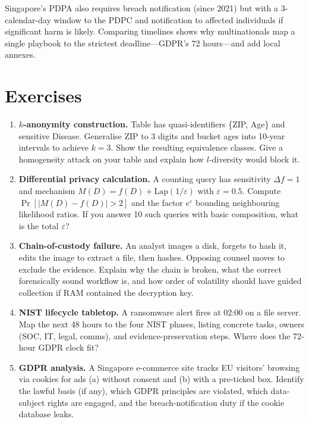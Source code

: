 \begin{remark}
Singapore's PDPA also requires breach notification (since 2021) but with a 3-calendar-day window to the PDPC and notification to affected individuals if significant harm is likely. Comparing timelines shows why multinationals map a single playbook to the strictest deadline---GDPR's 72 hours---and add local annexes.
\end{remark}
\section{Exercises}
\label{sec:ch08-exercises}
\begin{enumerate}[label=E8.\arabic*, leftmargin=*, itemsep=0.6em]
    \item \textbf{$k$-anonymity construction.} Table has quasi-identifiers \{ZIP, Age\} and sensitive Disease. Generalise ZIP to 3 digits and bucket ages into 10-year intervals to achieve $k=3$. Show the resulting equivalence classes. Give a homogeneity attack on your table and explain how $l$-diversity would block it.
    \item \textbf{Differential privacy calculation.} A counting query has sensitivity $\Delta f=1$ and mechanism $M(D)=f(D)+\mathrm{Lap}(1/\varepsilon)$ with $\varepsilon=0.5$. Compute $\Pr[|M(D)-f(D)|>2]$ and the factor $e^{\varepsilon}$ bounding neighbouring likelihood ratios. If you answer 10 such queries with basic composition, what is the total $\varepsilon$?
    \item \textbf{Chain-of-custody failure.} An analyst images a disk, forgets to hash it, edits the image to extract a file, then hashes. Opposing counsel moves to exclude the evidence. Explain why the chain is broken, what the correct forensically sound workflow is, and how order of volatility should have guided collection if RAM contained the decryption key.
    \item \textbf{NIST lifecycle tabletop.} A ransomware alert fires at 02:00 on a file server. Map the next 48 hours to the four NIST phases, listing concrete tasks, owners (SOC, IT, legal, comms), and evidence-preservation steps. Where does the 72-hour GDPR clock fit?
    \item \textbf{GDPR analysis.} A Singapore e-commerce site tracks EU visitors' browsing via cookies for ads (a) without consent and (b) with a pre-ticked box. Identify the lawful basis (if any), which GDPR principles are violated, which data-subject rights are engaged, and the breach-notification duty if the cookie database leaks.
\end{enumerate}
